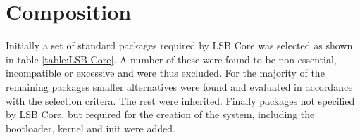 \section{Composition}\label{Composition}

Initially a set of standard packages required by LSB Core was selected as shown in table \ref{table:LSB Core}. A number of these were found to be non-essential, incompatible or excessive and were thus excluded. For the majority of the remaining packages smaller alternatives were found and evaluated in accordance with the selection critera. The rest were inherited. Finally packages not specified by LSB Core, but required for the creation of the system, including the bootloader, kernel and init were added.

\newpage

\newpage

\newpage

